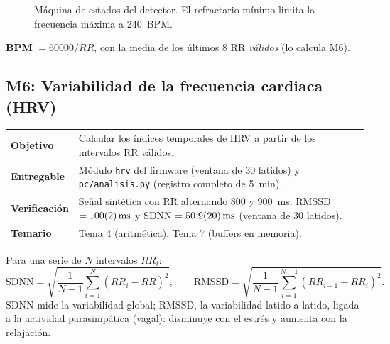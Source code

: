 \documentclass[11pt,a4paper]{article}
\newcommand{\modinfo}[4]{%
  \begin{center}\small
  \renewcommand{\arraystretch}{1.25}
  \begin{tabularx}{\textwidth}{>{\bfseries\color{navy}}lX}
  \toprule
  Objetivo     & #1 \\
  Entregable   & #2 \\
  Verificación & #3 \\
  Temario      & #4 \\
  \bottomrule
  \end{tabularx}
  \end{center}}
\begin{document}
\begin{figure}[H]
\centering
{}
\caption{Máquina de estados del detector. El refractario mínimo limita la frecuencia máxima
a \qty{240}{BPM}.}
\label{fig:fsm}
\end{figure}

\textbf{BPM} $= 60000/\overline{RR}$, con la media de los últimos 8 RR \emph{válidos} (lo
calcula M6).

\subsection{M6: Variabilidad de la frecuencia cardiaca (HRV)}

\modinfo{Calcular los índices temporales de HRV a partir de los intervalos RR válidos.}
{Módulo \texttt{hrv} del firmware (ventana de 30 latidos) y \texttt{pc/analisis.py} (registro
completo de \qty{5}{min}).}
{Señal sintética con RR alternando 800 y \qty{900}{ms}: RMSSD $= \qty{100 \pm 2}{ms}$ y SDNN
$= \qty{50.9 \pm 2}{ms}$ (ventana de 30 latidos).}
{Tema 4 (aritmética), Tema 7 (buffers en memoria).}

Para una serie de $N$ intervalos $RR_i$:
\[
  \mathrm{SDNN} = \sqrt{\frac{1}{N-1}\sum_{i=1}^{N}\left(RR_i - \overline{RR}\right)^2},
  \qquad
  \mathrm{RMSSD} = \sqrt{\frac{1}{N-1}\sum_{i=1}^{N-1}\left(RR_{i+1} - RR_i\right)^2}.
\]
SDNN mide la variabilidad global; RMSSD, la variabilidad latido a latido, ligada a la
actividad parasimpática (vagal): disminuye con el estrés y aumenta con la relajación.
\end{document}
